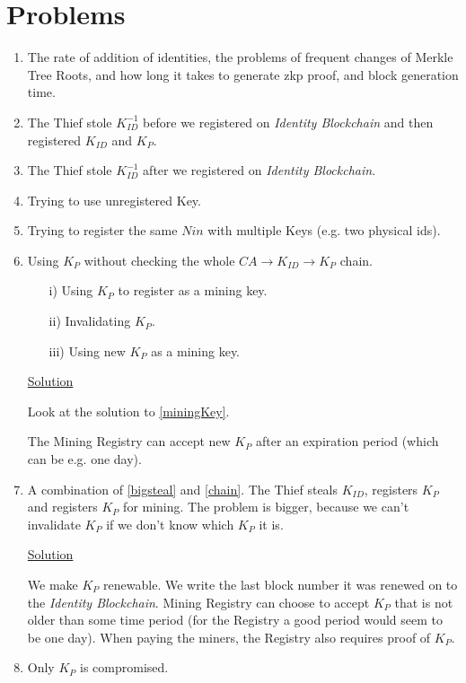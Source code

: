 \documentclass{article}
\newcommand{\khk}{K_{P}}
\newcommand{\kid}{K_{ID}}
\newcommand{\pbc}{\textit{Identity Blockchain}}
\begin{document}
\section{Problems}
\begin{enumerate}[label=\textbf{P\arabic*}]
\item The rate of addition of identities, the problems of frequent changes of Merkle Tree Roots, and how long it takes to generate zkp proof, and block generation time.
\item \label{bigsteal} The Thief stole $\kid^{-1}$ before we registered on \pbc{} and then registered $\kid$ and $\khk$.
\item The Thief stole $\kid^{-1}$ after we registered on \pbc.
\item Trying to use unregistered Key.
\item Trying to register the same $Nin$ with multiple Keys (e.g. two physical ids).
\item \label{chain} Using $\khk$ without checking the whole $CA\rightarrow \kid \rightarrow \khk$ chain.
  \begin{itemize}
    \item[i)] Using $\khk$ to register as a mining key.
    \item[ii)] Invalidating $\khk$.
    \item[iii)] Using new $\khk$ as a mining key.
  \end{itemize}
  \underline{Solution}

  Look at the solution to \ref{miningKey}.

  The Mining Registry can accept new $\khk$ after an expiration period (which can be e.g. one day).
\item \label{miningKey} A combination of \ref{bigsteal} and \ref{chain}. The Thief steals $\kid$, registers $\khk$ and registers $\khk$ for mining. The problem is bigger, because we can't invalidate $\khk$ if we don't know which $\khk$ it is.

  \underline{Solution}

  We make $\khk$ renewable. We write the last block number it was renewed on to the \pbc.
  Mining Registry can choose to accept $\khk$ that is not older than some time period (for the Registry a good period would seem to be one day).
  When paying the miners, the Registry also requires proof of $\khk$.
\item Only $\khk$ is compromised.
\end{enumerate}
\end{document}
